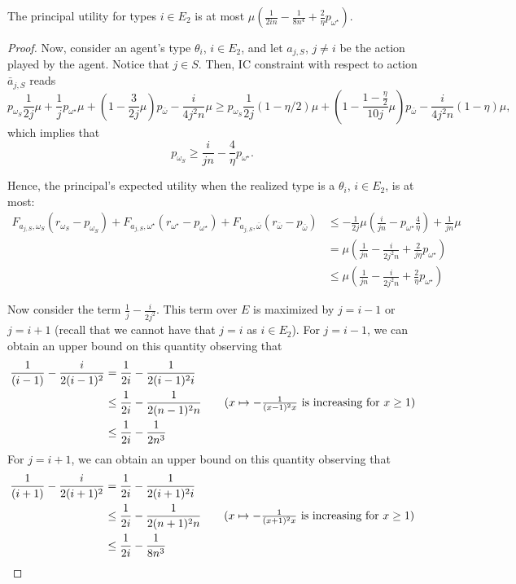 \begin{lemma}\label{lem:onlyif2}
   The principal utility for types $i\in E_2$ is at most $\mu\left(\frac{1}{2in}-\frac{1}{8n^4}+\frac{2}{\eta}p_{\omega^\star}\right)$.
\end{lemma}
\begin{proof}
    	Now, consider an agent's type $\theta_i$, $i\in E_2$, and let $a_{j,S}$, $j \neq i$ be the action played by the agent. 
	Notice that $j \in S$. Then, IC constraint with respect to action $\bar a_{j,S}$ reads
	\[
	p_{\omega_{S}} \frac{1}{2j} \mu + \frac{1}{j}p_{\omega^\star}\mu+(1-\frac{3}{2j}\mu)p_{\bar\omega}- \frac{i}{4j^2n}\mu \ge p_{\omega_{S}} \frac{1}{2j} (1-\eta/2) \mu+\left(1-\frac{1-\frac{\eta}{2}}{10j}\mu\right)p_{\bar\omega}- \frac{i}{4j^2n} (1-\eta) \mu,
	\]
	which implies that
	\[
	p_{\omega_{S}} \ge \frac{i}{jn}-  \frac{4}{\eta} p_{\omega^\star}. 
	\]
	
	Hence, the principal's expected utility when the realized type is a $\theta_i$, $i \in E_2$, is at most:
	\begin{align*}
		F_{a_{j,S},\omega_S}(r_{\omega_S}-p_{\omega_S})+F_{a_{j,S},\omega^\star}(r_{\omega^\star}-p_{\omega^\star})+F_{a_{j,S},\bar \omega}(r_{\bar \omega}-p_{\bar\omega})&\le-\frac{1}{2j}\mu\left( \frac{i}{jn}- p_{\omega^\star} \frac{4}{\eta}\right)+\frac{1}{jn}\mu\\
		&=\mu\left(\frac{1}{jn}-\frac{i}{2j^2n}+\frac{2}{j\eta}p_{\omega^\star}\right)\\
		&\le\mu\left(\frac{1}{jn}-\frac{i}{2j^2n}+\frac{2}{\eta}p_{\omega^\star}\right)
	\end{align*}

	Now consider the term $\frac{1}{j}-\frac{i}{2j^2}$.
    This term over $E$ is maximized by $j=i-1$ or $j=i+1$ (recall that we cannot have that $j=i$ as $i\in E_2$). 
    For $j=i-1$, we can obtain an upper bound on this quantity observing that
	\begin{align*}
		\frac{1}{(i-1)}-\frac{i}{2(i-1)^2}&=\frac{1}{2i}-\frac{1}{2(i-1)^2i}\\
		&\le \frac{1}{2i} -\frac{1}{2(n-1)^2n}\tag{$x\mapsto -\frac{1}{(x-1)^2x}$ is increasing for $x\ge 1$}\\
		&\le \frac{1}{2i}-\frac{1}{2n^3}
	\end{align*}
    For $j=i+1$, we can obtain an upper bound on this quantity observing that
	\begin{align*}
		\frac{1}{(i+1)}-\frac{i}{2(i+1)^2}&=\frac{1}{2i}-\frac{1}{2(i+1)^2i}\\
		&\le \frac{1}{2i} -\frac{1}{2(n+1)^2n}\tag{$x\mapsto -\frac{1}{(x+1)^2x}$ is increasing for $x\ge 1$}\\
		&\le\frac{1}{2i} -\frac{1}{8n^3}
	\end{align*}
	

\end{proof}
